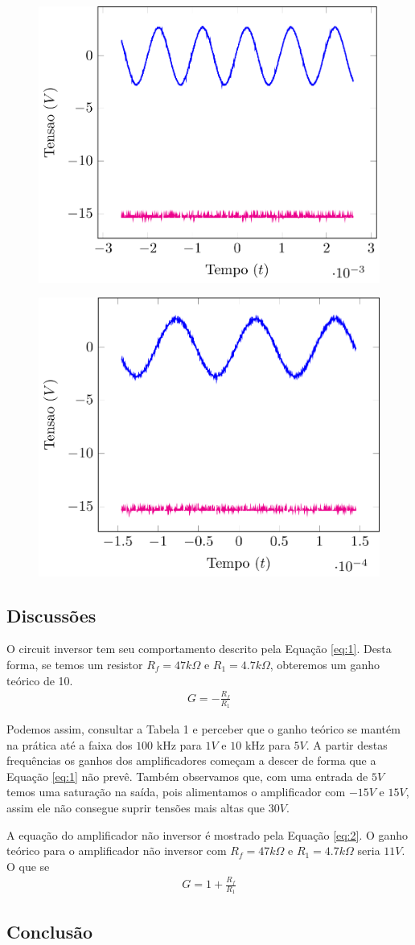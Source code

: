 \documentclass[12pt,a4paper]{article}
\begin{document}
\begin{figure}[htpb]
  \centering
  \includegraphics[width=0.8\linewidth]{./img/4V_1K.pdf}
  \label{4V1K}
\end{figure}
\begin{figure}[htpb]
  \centering
  \includegraphics[width=0.8\linewidth]{./img/4V_100K.pdf}
  \label{4V100K}
\end{figure}
\subsection{Discussões}
O circuit inversor tem seu comportamento descrito pela Equação \ref{eq:1}. Desta forma, se temos um resistor $R_f =47 k\Omega$ e $R_1 = 4.7 k\Omega$, obteremos um ganho teórico de 10.
\begin{align}
  \label{eq:1}
G= - \frac{R_f}{R_1} 
\end{align}

Podemos assim, consultar a Tabela 1 e perceber que o ganho teórico se mantém na prática até a faixa dos $100$ kHz para $1V$ e $10$ kHz para $5V$. A partir destas frequências os ganhos dos amplificadores começam a descer de forma que a Equação \ref{eq:1} não prevê. Também observamos que, com uma entrada de $5V$ temos uma saturação na saída, pois alimentamos o amplificador com $-15V$ e $15V$, assim ele não consegue suprir tensões mais altas que $30V$.

A equação do amplificador não inversor é mostrado pela Equação \ref{eq:2}. O ganho teórico para o amplificador não inversor com $R_f = 47 k\Omega$ e $R_1=4.7 k\Omega$ seria $11V$. O que se 
\begin{align}
  \label{eq:2}
  G = 1 + \frac{R_f}{R_1} 
\end{align}
\subsection{Conclusão}
\end{document}
